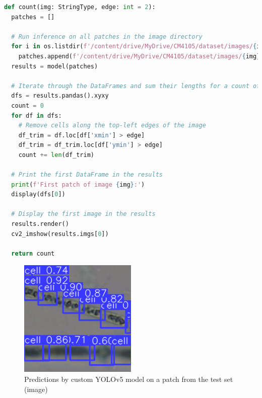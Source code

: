\begin{lstlisting}[language=Python, caption={The counting component's principal function, count(...)}, label={def_count}]
def count(img: StringType, edge: int = 2):
  patches = []

  # Run inference on all patches in the image directory
  for i in os.listdir(f'/content/drive/MyDrive/CM4105/dataset/images/{img}'):
    patches.append(f'/content/drive/MyDrive/CM4105/dataset/images/{img}/' + i)
  results = model(patches)

  # Iterate through the DataFrames and sum their lengths for a count of cells in the image
  dfs = results.pandas().xyxy
  count = 0
  for df in dfs:
    # Remove cells along the top-left edges of the image
    df_trim = df.loc[df['xmin'] > edge]
    df_trim = df_trim.loc[df['ymin'] > edge]
    count += len(df_trim)

  # Print the first DataFrame in the results
  print(f'First patch of image {img}:')
  display(dfs[0])

  # Display the first image in the results
  results.render()
  cv2_imshow(results.imgs[0])

  return count
\end{lstlisting}

\begin{figure}[h!]
	\centering
	\includegraphics[width=0.5\textwidth]{images/04Implementation/patch.png}
	\caption{Predictions by custom YOLOv5 model on a patch from the test set (image)}
\end{figure}

